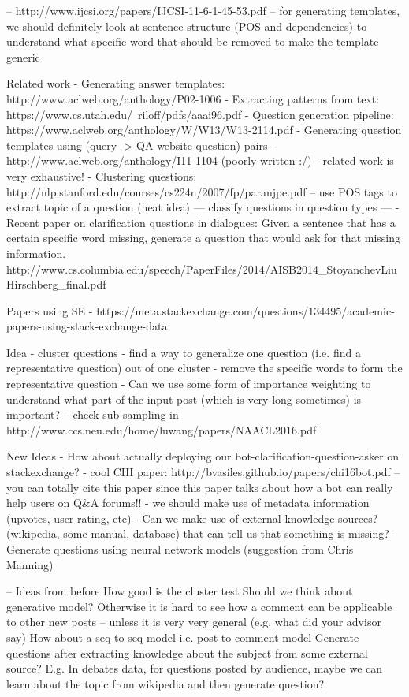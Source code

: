 \documentclass[11pt]{article}
\begin{document}
-- http://www.ijcsi.org/papers/IJCSI-11-6-1-45-53.pdf
-- for generating templates, we should definitely look at sentence structure (POS and dependencies) to understand what specific word that should be removed to make the template generic

Related work
- Generating answer templates: http://www.aclweb.org/anthology/P02-1006
- Extracting patterns from text: https://www.cs.utah.edu/~riloff/pdfs/aaai96.pdf
- Question generation pipeline: https://www.aclweb.org/anthology/W/W13/W13-2114.pdf
- Generating question templates using (query -> QA website question) pairs - http://www.aclweb.org/anthology/I11-1104 (poorly written :/) - related work is very exhaustive!
- Clustering questions: http://nlp.stanford.edu/courses/cs224n/2007/fp/paranjpe.pdf -- use POS tags to extract topic of a question (neat idea) --- classify questions in question types --- 
- Recent paper on clarification questions in dialogues: Given a sentence that has a certain specific word missing, generate a question that would ask for that missing information. http://www.cs.columbia.edu/speech/PaperFiles/2014/AISB2014_StoyanchevLiuHirschberg_final.pdf

Papers using SE - https://meta.stackexchange.com/questions/134495/academic-papers-using-stack-exchange-data

Idea
- cluster questions
- find a way to generalize one question (i.e. find a representative question) out of one cluster
- remove the specific words to form the representative question
- Can we use some form of importance weighting to understand what part of the input post (which is very long sometimes) is important? -- check sub-sampling in http://www.ccs.neu.edu/home/luwang/papers/NAACL2016.pdf


New Ideas
- How about actually deploying our bot-clarification-question-asker on stackexchange? - cool CHI paper: http://bvasiles.github.io/papers/chi16bot.pdf -- you can totally cite this paper since this paper talks about how a bot can really help users on Q&A forums!!
- we should make use of metadata information (upvotes, user rating, etc)
- Can we make use of external knowledge sources? (wikipedia, some manual, database) that can tell us that something is missing?
- Generate questions using neural network models (suggestion from Chris Manning)

-- Ideas from before
How good is the cluster test
Should we think about generative model? Otherwise it is hard to see how a comment can be applicable to other new posts -- unless it is very very general (e.g. what did your advisor say) 
How about a seq-to-seq model i.e. post-to-comment model
Generate questions after extracting knowledge about the subject from some external source? E.g. In debates data, for questions posted by audience, maybe we can learn about the topic from wikipedia and then generate question?
\end{document}
